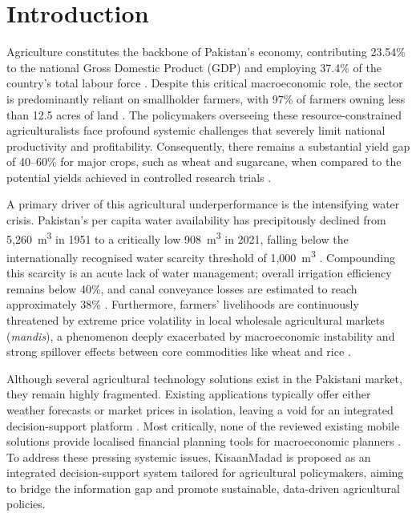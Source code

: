 \documentclass{FastFyp}
\begin{document}
\pagestyle{fancy} %
\tableofcontents

\pagebreak
\listoffigures	%
\pagebreak
\listoftables %

\mainmatter


\chapter{Introduction}

Agriculture constitutes the backbone of Pakistan's economy, contributing 23.54\% to the national Gross Domestic Product (GDP) and employing 37.4\% of the country's total labour force \cite{pakistan_economic_survey_2025}. Despite this critical macroeconomic role, the sector is predominantly reliant on smallholder farmers, with 97\% of farmers owning less than 12.5 acres of land \cite{rana2025farmers}. The policymakers overseeing these resource-constrained agriculturalists face profound systemic challenges that severely limit national productivity and profitability. Consequently, there remains a substantial yield gap of 40--60\% for major crops, such as wheat and sugarcane, when compared to the potential yields achieved in controlled research trials \cite{pbc2024agriculture}.

A primary driver of this agricultural underperformance is the intensifying water crisis. Pakistan's per capita water availability has precipitously declined from 5,260~m\textsuperscript{3} in 1951 to a critically low 908~m\textsuperscript{3} in 2021, falling below the internationally recognised water scarcity threshold of 1,000~m\textsuperscript{3} \cite{pcrwr2021water}. Compounding this scarcity is an acute lack of water management; overall irrigation efficiency remains below 40\%, and canal conveyance losses are estimated to reach approximately 38\% \cite{pcrwr2021water}. Furthermore, farmers' livelihoods are continuously threatened by extreme price volatility in local wholesale agricultural markets (\textit{mandis}), a phenomenon deeply exacerbated by macroeconomic instability and strong spillover effects between core commodities like wheat and rice \cite{habib2021price}. 

Although several agricultural technology solutions exist in the Pakistani market, they remain highly fragmented. Existing applications typically offer either weather forecasts or market prices in isolation, leaving a void for an integrated decision-support platform \cite{pasha2024agritech}. Most critically, none of the reviewed existing mobile solutions provide localised financial planning tools for macroeconomic planners \cite{pasha2024agritech}. To address these pressing systemic issues, KisaanMadad is proposed as an integrated decision-support system tailored for agricultural policymakers, aiming to bridge the information gap and promote sustainable, data-driven agricultural policies.
\end{document}
